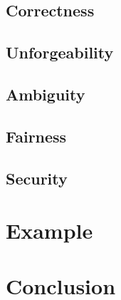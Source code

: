 \documentclass{beamer}
\begin{document}
\subsection{Correctness}


\subsection{Unforgeability}


\subsection{Ambiguity}


\subsection{Fairness}


\subsection{Security}


\section{Example}


\section{Conclusion}

\end{document}
